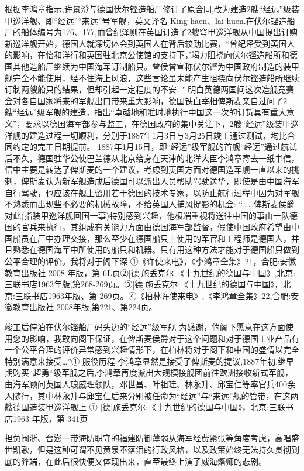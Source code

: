 \documentclass[12pt,UTF8]{ctexbook}
\begin{document}
根据李鸿章指示,许景澄与德国伏尔铿造船厂修订了原合同,改为建造2艘“经远”级装甲巡洋舰、即“经远”“来远”号军舰，英文译名 King haen、lai huen.在伏尔铿造船厂的船体编号为176、177,而曾纪泽则在英国订造了2艘穹甲巡洋舰从中国提出订购新巡洋舰开始，德国人就深切体会到英国人在背后较劲比赛，“曾纪泽受到英国人的影响，在怡和洋行和英国驻北京公使馆的支持下，'竭力阻挠向伏尔铿造船所和德国其他造船厂继续为中国海军订制船只。曾侯曾宣称伏尔铿为中国政府制造的装甲舰完全不能使用，经不住海上风浪，这些言论虽未能产生阻挠向伏尔铿造船所继续订制两艘船只的结果，但却引起一定程度的不安…"
明白英德两国间这次造舰竞赛会对各自国家将来的军舰出口带来重大影响，德国铁血宰相俾斯麦亲自过问了2艘“经远”级军舰的建造，指出“卓越地和准时地执行中国这一次的订货具有重大意义”，要求以德国海军部参与监工，在德国政府的集中关注下，2艘“经远”级装甲巡洋舰的建造过程一切顺利，分别于1887年1月3日与3月25日竣工通过测试，均比合同约定的完工日期提前。
1887年1月15日，即“经远”级军舰的首舰“经远”通过航试后不久，德国驻华公使巴兰德从北京给身在天津的北洋大臣李鸿章寄去一纸书信，信中主要是转达了俾斯麦的一个建议，考虑到英国方面对德国造军舰一直以来的挑刺，俾斯麦认为新军舰造成后德国可以派出人员帮助驾驶送华，即使是由中国海军自行驾驶，也应该在舰上留用若干德国的技术专家，以防止航行过程中因为对军舰不熟悉而出现些不必要的机械故障，不给英国人捕风捉影的机会:
“……俾斯麦侯爵对此(指装甲巡洋舰回国一事)特别感到兴趣，他极端重视将送往中国的事由一队德国的官兵来执行，其组成有关能力方面由德国海军部监督，假使中国政府希望由中国船员在厂中办理交接，那么至少在德国船只上使用的军官和工程师是德国人，并且熟悉在德国海军中所使用的船只和机器。只有用这种方法才能对于德国船只做到公平合理的评价。我将对于阁下深
①《许使来电》，《李鸿章全集》21，合肥:安徽教育出版社 2008 年版，第 6L页②[德]施丢克尔:《十九世纪的德国与中国》,北京:三联书店1963年版,第268-269页。③[德]施丢克尔:《十九世纪的德国与中国》，北京:三联书店1963年版、第 269页。④《柏林许使来电》,《李鸿章全集》22,合肥:安徽教育出版社 2008年版,第221、第224页。

竣工后停泊在伏尔铿船厂码头边的“经远”级军舰
为感谢，倘阁下愿意在这方面使用您的影响，我敢向阁下保证，在俾斯麦侯爵对于这个问题和对于德国工业产品有一个公平合理的评价异常感到兴趣情形下，在柏林将对于阁下和中国的盛情以完全特别满意来接受…”①
服役历程
李鸿章显然是接受了俾斯麦的提议,1887年初,继早期购买“超勇“级军舰之后,李鸿章再度派出大规模接舰团前往欧洲接收新式军舰，由海军顾问英国人琅威理领队，邓世昌、叶祖珪、林永升、邱宝仁等率官兵400余人随行，其中林永升与邱宝仁后来分别被任命为“经远”与“来远”舰的管带，在这两艘德国造装甲巡洋舰上
① [德]施丢克尔:《十九世纪的德国与中国》，北京:三联书店1963 年版，第 341页

担负闽浙、台澎一带海防职守的福建防御薄弱从海军经费紧张等角度考虑，高唱盛世凯歌，但是这种可谓不见黄泉不落泪的行政风格，以及政策始终无法持久贯彻到底的弊端，在此后很快便又体现出来，直至最终上演了威海熸师的悲剧。
\end{document}
